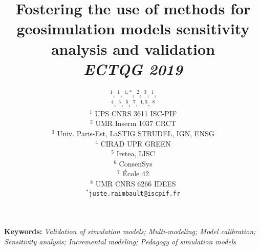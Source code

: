 \documentclass[11pt]{article}
\begin{document}
\title{\vspace{-1cm}Fostering the use of methods for geosimulation models sensitivity analysis and validation
\\\medskip
\textit{ECTQG 2019}
}
\author{$^{1}$, $^{1}$, $^{1,\ast}$, $^2$, $^3$, $^1$,\\
 $^4$, $^5$, $^6$, $^7$, $^{1,3}$, $^8$\medskip\\
$^1$ UPS CNRS 3611 ISC-PIF\\
$^2$ UMR Inserm 1037 CRCT\\
$^3$ Univ. Paris-Est, LaSTIG STRUDEL, IGN, ENSG\\
$^4$ CIRAD UPR GREEN\\%
$^5$ Irstea, LISC \\
$^6$ ConsenSys\\
$^7$ {\'E}cole 42\\
$^8$ UMR CNRS 6266 IDEES
\medskip\\
$^{\ast}$\texttt{juste.raimbault@iscpif.fr}
}
\date{}

\maketitle

\justify



\textbf{Keywords: }\textit{Validation of simulation models; Multi-modeling; Model calibration; Sensitivity analysis; Incremental modeling; Pedagogy of simulation models}

\medskip
\end{document}
